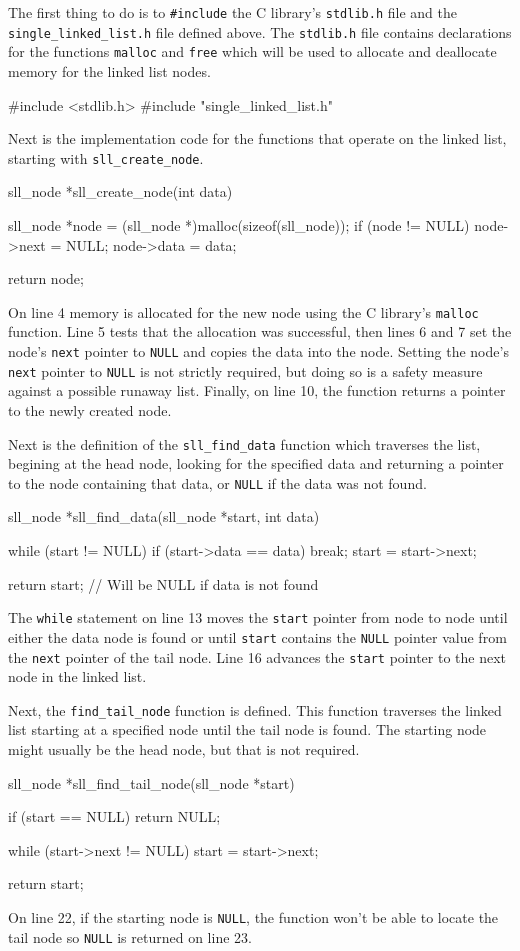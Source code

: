 \documentclass{article}
\begin{document}
  The first thing to do is to \verb|#include| the C library's \verb|stdlib.h| file and the \verb|single_linked_list.h| file defined above. The \verb|stdlib.h| file contains declarations for the functions \verb|malloc| and \verb|free| which will be used to allocate and deallocate memory for the linked list nodes.
  \begin{lstc}[firstnumber=1]
#include <stdlib.h>
#include "single_linked_list.h"\end{lstc}
  Next is the implementation code for the functions that operate on the linked list, starting with \verb|sll_create_node|.
  \begin{lstc}
sll_node *sll_create_node(int data) {
  sll_node *node = (sll_node *)malloc(sizeof(sll_node));
  if (node != NULL) {
    node->next = NULL;
    node->data = data;
  }

  return node;
}\end{lstc}
  On line 4 memory is allocated for the new node using the C library's \verb|malloc| function. Line 5 tests that the allocation was successful, then lines 6 and 7 set the node's \verb|next| pointer to \verb|NULL| and copies the data into the node. Setting the node's \verb|next| pointer to \verb|NULL| is not strictly required, but doing so is a safety measure against a possible runaway list. Finally, on line 10, the function returns a pointer to the newly created node.

  Next is the definition of the \verb|sll_find_data| function which traverses the list, begining at the head node, looking for the specified data and returning a pointer to the node containing that data, or \verb|NULL| if the data was not found.
  \begin{lstc}
sll_node *sll_find_data(sll_node *start, int data) {
  while (start != NULL) {
    if (start->data == data)
      break;
    start = start->next;
  }

  return start; // Will be NULL if data is not found
}\end{lstc}
  The \verb|while| statement on line 13 moves the \verb|start| pointer from node to node until either the data node is found or until \verb|start| contains the \verb|NULL| pointer value from the \verb|next| pointer of the tail node. Line 16 advances the \verb|start| pointer to the next node in the linked list.

  Next, the \verb|find_tail_node| function is defined. This function traverses the linked list starting at a specified node until the tail node is found. The starting node might usually be the head node, but that is not required.
  \begin{lstc}
sll_node *sll_find_tail_node(sll_node *start) {
  if (start == NULL)
    return NULL;

  while (start->next != NULL)
    start = start->next;

  return start;
}\end{lstc}
  On line 22, if the starting node is \verb|NULL|, the function won't be able to locate the tail node so \verb|NULL| is returned on line 23.
\end{document}

